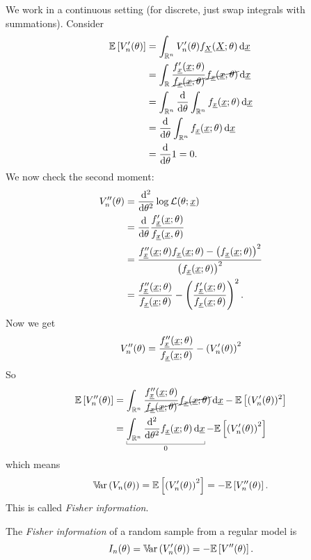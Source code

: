 \documentclass[12pt]{report}
\begin{document}
We work in a continuous setting (for discrete, just swap integrals with summations). Consider
\begin{align*}
	\ev{V'_{n}(\theta)}&=\int_{\R^{n}}V'_{n}(\theta)f_{\underline{X}}(\underline{X};\theta)\dif\underline{x}\\
	&=\int_{\R}\frac{f'_{\underline{x}}(\underline{x};\theta)}{\cancel{f_{\underline{x}}(\underline{x},\theta)}}\cancel{f_{\underline{x}}(\underline{x},\theta)}\dif\underline{x}\\
	&=\int_{\R^{n}}\frac{\dif}{\dif \theta}\int_{\R^{n}}f_{\underline{x}}(\underline{x};\theta)\dif\underline{x}\\
	&=\frac{\dif}{\dif\theta}\int_{\R^{n}}f_{\underline{x}}(\underline{x};\theta)\dif\underline{x}\\
	&=\frac{\dif}{\dif\theta}1=0.
\end{align*}
We now check the second moment:
\begin{align*}
	V''_{n}(\theta)&=\frac{\mathop{}\!\mathrm{d}^{2}}{\mathop{}\!\mathrm{d}\theta^{2}}\log\mathcal{L}(\theta;\underline{x})\\
	&=\frac{\mathop{}\!\mathrm{d}}{\mathop{}\!\mathrm{d}\theta}\frac{f'_{\underline{x}}(\underline{x};\theta)}{f_{\underline{x}}(\underline{x},\theta)}\\
	&=\frac{f''_{\underline{x}}(\underline{x};\theta)f_{\underline{x}}(\underline{x};\theta)-\left(f_{\underline{x}}(\underline{x};\theta)\right)^{2}}{\left(f_{\underline{x}}(\underline{x};\theta)\right)^{2}}\\
	&=\frac{f''_{\underline{x}}(\underline{x};\theta)}{f_{\underline{x}}(\underline{x};\theta)}-\left(\frac{f'_{\underline{x}}(\underline{x};\theta)}{f_{\underline{x}}(\underline{x};\theta)}\right)^{2}.
	\end{align*}
Now we get
\begin{equation*}
	V''_{n}(\theta)=\frac{f''_{\underline{x}}(\underline{x};\theta)}{f_{\underline{x}}(\underline{x};\theta)}-\left(V'_{n}(\theta)\right)^{2}
\end{equation*}
So 
\begin{align*}
	\ev{V''_{n}(\theta)}&=\int_{\R^{n}}\frac{f''_{\ulx}(\ulx;\theta)}{\cancel{f_{\ulx}(\ulx;\theta)}}\cancel{f_{\ulx}(\ulx;\theta)}\dif\ulx-\ev{(V'_{n}(\theta))^{2}}\\
	&=\ubracketthin{\int_{\R^{n}}\frac{\dif^{2}}{\dif\theta^{2}}f_{\ulx}(\ulx;\theta)\dif\ulx}_{0}-\ev{\left(V'_{n}(\theta)\right)^{2}}
\end{align*}
which means
\begin{equation*}
	\mathbb{V}\!\mathrm{ar}\,(V_{n}(\theta))=\mathbb{E}\left[\left(V'_{n}(\theta)\right)^{2}\right]=-\mathbb{E}\left[V''_{n}(\theta)\right].
\end{equation*}
This is called \emph{Fisher information}.
\begin{definition}
	The \emph{Fisher information} of a random sample from a regular model is
	\begin{equation*}
		I_{n}(\theta)=\mathbb{V}\!\mathrm{ar}\,(V'_{n}(\theta))=-\mathbb{E}\left[V''(\theta)\right].
	\end{equation*}
\end{definition}
\end{document}
